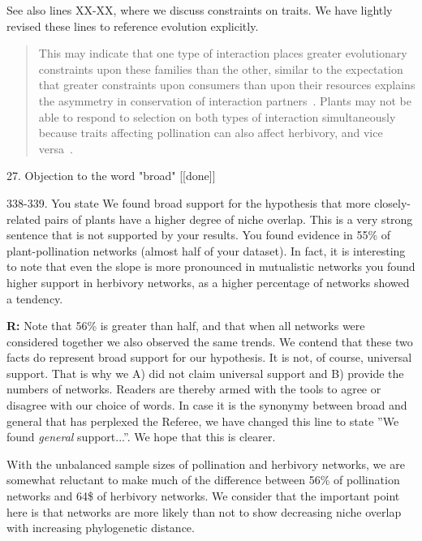 \documentclass[12pt]{letter}
\newenvironment{refquote}{\bigskip \begin{it}}{\end{it}\smallskip}
\begin{document}
		See also lines XX-XX, where we discuss constraints on traits. We have lightly revised these lines to reference evolution explicitly. 

		\begin{quotation}

		 This may indicate that one type of interaction
		  places greater evolutionary constraints upon these families than the other, 
		  similar to the expectation that greater constraints upon consumers 
		  than upon their resources explains the asymmetry in conservation  
		  of interaction partners~\citep{Fontaine2015}. Plants
		  may not be able to respond to selection on both types of interaction
		  simultaneously because traits affecting pollination can also affect herbivory, and vice
		  versa~\citep{Strauss1997,Strauss2002,Adler2004,Adler2006,Theis2006}.
  		\end{quotation}


	27. Objection to the word "broad" [[done]]

		\begin{refquote}
			338-339. You state We found broad support for the hypothesis that more closely-related pairs of plants have a higher degree of niche overlap. This is a very strong sentence that is not supported by your results. You found evidence in 55\% of plant-pollination networks (almost half of your dataset). In fact, it is interesting to note that even the slope is more pronounced in mutualistic networks you found higher support in herbivory networks, as a higher percentage of networks showed a tendency.
		\end{refquote}


		\textbf{R:} Note that 56\% is greater than half, and that when all networks were considered together we also observed the same trends. We contend that these two facts do represent broad support for our hypothesis. It is not, of course, universal support. That is why we A) did not claim universal support and B) provide the numbers of networks. Readers are thereby armed with the tools to agree or disagree with our choice of words. In case it is the synonymy between broad and general that has perplexed the Referee, we have changed this line to state ''We found \emph{general} support...''. We hope that this is clearer.


		With the unbalanced sample sizes of pollination and herbivory networks, we are somewhat reluctant to make much of the difference between 56\% of pollination networks and 64\$ of herbivory networks. We consider that the important point here is that networks are more likely than not to show decreasing niche overlap with increasing phylogenetic distance. 
\end{document}
